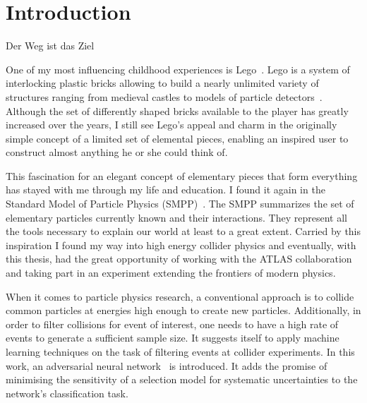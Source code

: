 

\chapter{Introduction}
\epigraph{Der Weg ist das Ziel}{}
\label{chp:intro}

One of my most influencing childhood experiences is {Lego\textsuperscript{\textregistered}}~\cite{lego}. Lego is a system of interlocking plastic bricks allowing to build a nearly unlimited variety of structures ranging from medieval castles to models of particle detectors~\cite{atlas_lego}. Although the set of differently shaped bricks available to the player has greatly increased over the years, I still see Lego's appeal and charm in the originally simple concept of a limited set of elemental pieces, enabling an inspired user to construct almost anything he or she could think of.

This fascination for an elegant concept of elementary pieces that form everything has stayed with me through my life and education. I found it again in the Standard Model of Particle Physics (SMPP)~\cite{thomson}.
The SMPP summarizes the set of elementary particles currently known and their interactions. They represent all the tools necessary to explain our world at least to a great extent.
Carried by this inspiration I found my way into high energy collider physics and eventually, with this thesis, had the great opportunity of working with the ATLAS collaboration and taking part in an experiment extending the frontiers of modern physics.

When it comes to particle physics research, a conventional approach is to collide common particles at energies high enough to create new particles. Additionally, in order to filter collisions for event of interest, one needs to have a high rate of events to generate a sufficient sample size.
It suggests itself to apply machine learning techniques on the task of filtering events at collider experiments.
In this work, an adversarial neural network~\cite{Louppe:2016ylz} is introduced. It adds the promise of minimising the sensitivity of a selection model for systematic uncertainties to the network's classification task.

